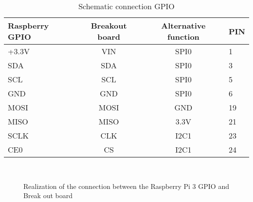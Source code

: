 \begin{table}[!h]
	\centering
	\begin{tabular}{l c c l}
		\hline
		Raspberry GPIO	& Breakout board & 	Alternative function &	PIN \\
		\hline
		+3.3V			& 	VIN			 &	 SPI0 				 &	1	\\
		SDA				& 	SDA			 &	 SPI0 				 &	3	\\
		SCL				& 	SCL			 &	 SPI0 				 &	5	\\
		GND				& 	GND			 &	 SPI0 				 &	6 	\\
		MOSI			& 	MOSI		 &	 GND  				 &	19	\\	
 		MISO			& 	MISO		 &	 3.3V 				 &	21	\\	
 		SCLK			& 	CLK			 &	 I2C1 				 &	23	\\
 		CE0				& 	CS			 &	 I2C1 				 &	24	\\
 		\hline
	\end{tabular}
	\caption{Schematic connection GPIO}
	\label{tab:scheme-gpio}
\end{table}
%
\begin{figure}[htb]
    \centering
     \quad
     \\
    \caption{Realization of the connection between the Raspberry Pi 3 GPIO and Break out board}
    \label{fig:brekout-gpio}
\end{figure}
